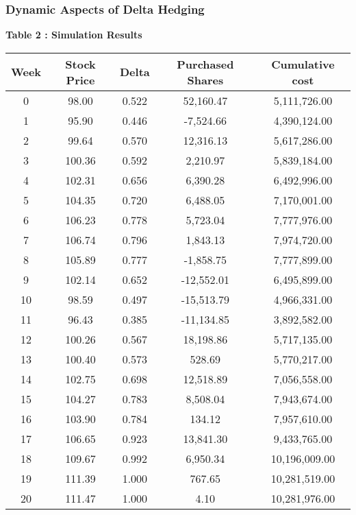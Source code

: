 \documentclass[cjk]{beamer}
\begin{document}
\begin{CJK*}{UTF8}{gbsn}
\begin{frame}
\frametitle{Dynamic Aspects of Delta Hedging}
\caption{\bfseries \color{blue} Table 2 : Simulation Results}
\scriptsize
\begin{tabular}{c c c c c}
\toprule
\hline
\textbf{Week} & \textbf{Stock Price} & \textbf{Delta}  & \textbf{Purchased Shares} & \textbf{Cumulative cost}\\
\midrule
\hline
0	  & 98.00 	  & 0.522 	  & 52,160.47 	  & 5,111,726.00  \\
1	  & 95.90 	  & 0.446 	  & -7,524.66 	  & 4,390,124.00  \\
2	  & 99.64 	  & 0.570 	  & 12,316.13 	  & 5,617,286.00  \\
3	  & 100.36    & 0.592 	  & 2,210.97 	  & 5,839,184.00  \\
4	  & 102.31 	  & 0.656 	  & 6,390.28 	  & 6,492,996.00  \\
5	  & 104.35 	  & 0.720 	  & 6,488.05 	  & 7,170,001.00  \\
6	  & 106.23 	  & 0.778 	  & 5,723.04 	  & 7,777,976.00  \\
7	  & 106.74    &	0.796 	  & 1,843.13 	  & 7,974,720.00  \\
8	  & 105.89 	  & 0.777 	  & -1,858.75 	  & 7,777,899.00  \\
9	  & 102.14 	  & 0.652 	  & -12,552.01 	  & 6,495,899.00  \\
10	  & 98.59 	  & 0.497 	  & -15,513.79 	  & 4,966,331.00  \\
11	  & 96.43 	  & 0.385 	  & -11,134.85 	  & 3,892,582.00  \\
12	  & 100.26 	  & 0.567 	  & 18,198.86 	  & 5,717,135.00  \\
13	  & 100.40 	  & 0.573 	  & 528.69 	      & 5,770,217.00  \\
14	  & 102.75    &	0.698 	  & 12,518.89 	  & 7,056,558.00  \\
15	  & 104.27 	  & 0.783 	  & 8,508.04 	  & 7,943,674.00  \\
16	  & 103.90 	  & 0.784 	  & 134.12 	      & 7,957,610.00  \\
17	  & 106.65 	  & 0.923 	  & 13,841.30 	  & 9,433,765.00  \\
18	  & 109.67 	  & 0.992 	  & 6,950.34 	  & 10,196,009.00  \\
19	  & 111.39 	  & 1.000 	  & 767.65 	      & 10,281,519.00  \\
20	  & 111.47 	  & 1.000 	  & 4.10 	      & 10,281,976.00  \\
\hline
\bottomrule
\end{tabular}


\end{frame}
\end{CJK*}
\end{document}
